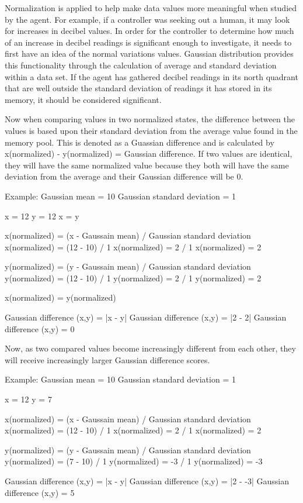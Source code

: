 
Normalization is applied to help make data values more meaningful when studied by the agent.
For example, if a controller was seeking out a human, it may look for increases in decibel values.
In order for the controller to determine how much of an increase in decibel readings is significant enough to investigate, it needs to first have an idea of the normal variations values.
Gaussian distribution provides this functionality through the calculation of average and standard deviation within a data set.
If the agent has gathered decibel readings in its north quadrant that are well outside the standard deviation of readings it has stored in its memory, it should be considered significant.

Now when comparing values in two normalized states, the difference between the values is based upon their standard deviation from the average value found in the memory pool.
This is denoted as a Guassian difference and is calculated by x(normalized) - y(normalized) = Gaussian difference. 
If two values are identical, they will have the same normalized value because they both will have the same deviation from the average and their Gaussian difference will be 0.

\begin{listings}
Example:
Gaussian mean = 10
Gaussian standard deviation = 1

x = 12
y = 12
x = y

x(normalized) = (x - Gaussain mean) / Gaussian standard deviation
x(normalized) = (12 - 10) / 1
x(normalized) = 2 / 1
x(normalized) = 2

y(normalized) = (y - Gaussain mean) / Gaussian standard deviation
y(normalized) = (12 - 10) / 1
y(normalized) = 2 / 1
y(normalized) = 2

x(normalized) = y(normalized)

Gaussian difference (x,y) = |x - y|
Gaussian difference (x,y) = |2 - 2|
Gaussian difference (x,y) = 0
\end{listings}

Now, as two compared values become increasingly different from each other, they will receive increasingly larger Gaussian difference scores.

\begin{listings}
Example:
Gaussian mean = 10
Gaussian standard deviation = 1

x = 12
y = 7

x(normalized) = (x - Gaussain mean) / Gaussian standard deviation
x(normalized) = (12 - 10) / 1
x(normalized) = 2 / 1
x(normalized) = 2

y(normalized) = (y - Gaussain mean) / Gaussian standard deviation
y(normalized) = (7 - 10) / 1
y(normalized) = -3 / 1
y(normalized) = -3

Gaussian difference (x,y) = |x - y|
Gaussian difference (x,y) = |2 - -3|
Gaussian difference (x,y) = 5
\end{listings}


